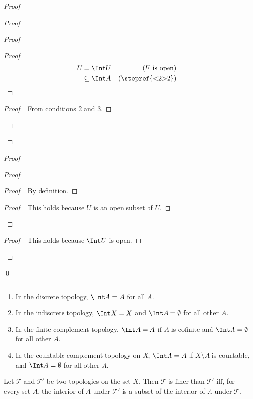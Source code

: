 \begin{proof}
\begin{proof}
\begin{proof}
\begin{proof}
\begin{align*}
          U & = \Int U & (\text{$U$ is open})\\
          & \subseteq \Int A & (\text{\stepref{<2>2}})
        \end{align*}
      \end{proof}
      \begin{proof}
        \pf\ From conditions 2 and 3.
      \end{proof}
    \end{proof}
  \end{proof}
  \begin{proof}
    \begin{proof}
      \begin{proof}
        \pf\ By definition.
      \end{proof}
      \begin{proof}
        \pf\ This holds because $U$ is an open subset of $U$.
      \end{proof}
    \end{proof}
    \begin{proof}
      \pf\ This holds because $\Int U$ is open.
    \end{proof}
  \end{proof}
  \qed
\end{proof}

\begin{ex}$ $
  \begin{enumerate}
    \item
    In the discrete topology, $\Int A = A$ for all $A$.
    \item
    In the indiscrete topology, $\Int X = X$ and $\Int A = \emptyset$ for all other $A$.
    \item
    In the finite complement topology, $\Int A = A$ if $A$ is cofinite and $\Int A = \emptyset$ for all other $A$.
    \item
    In the countable complement topology on $X$, $\Int A = A$ if $X \setminus A$ is countable, and $\Int A = \emptyset$ for all other $A$.
  \end{enumerate}
\end{ex}

\begin{prop}
  \label{prop:interior:finer}
  Let $\mathcal{T}$ and $\mathcal{T}'$ be two topologies on the set $X$. Then $\mathcal{T}$ is finer than $\mathcal{T}'$ iff, for every set $A$, the interior of $A$ under $\mathcal{T}'$ is a subset of the interior of $A$ under $\mathcal{T}$.
\end{prop}

